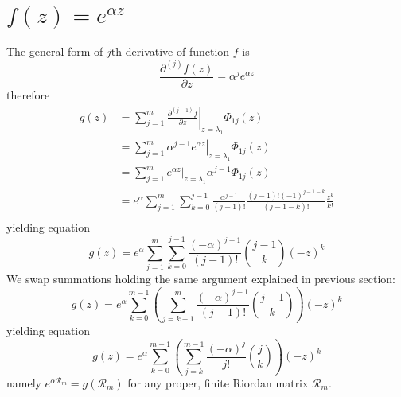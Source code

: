 \section{$f(z)=e^{\alpha z}$}

The general form of $j$th derivative of function $f$ is 
$$\frac{\partial^{(j)}{f}(z)}{\partial{z}} = \alpha^{j} e^{\alpha z}$$ 
therefore
\begin{displaymath}
\begin{split}
  g(z) &= \sum_{j=1}^{m}{ \left. \frac{\partial^{(j-1)}{f}}{\partial{z}} \right|_{z=\lambda_{1}}\Phi_{1j}(z)} \\
       &= \sum_{j=1}^{m}{ \left. \alpha^{j-1} e^{\alpha z} \right|_{z=\lambda_{1}}\Phi_{1j}(z)} \\
       &= \sum_{j=1}^{m}{ \left. e^{\alpha z} \right|_{z=\lambda_{1}}\alpha^{j-1} \Phi_{1j}(z)} \\
       &= e^{\alpha}\sum_{j=1}^{m}{\sum_{k=0}^{j-1}{\frac{\alpha^{j-1}}{(j-1)!}  \frac{(j-1)!(-1)^{j-1-k}}{(j-1-k)!}\frac{z^{k}}{k!}}}\\
\end{split}
\end{displaymath}
yielding equation
\begin{equation}
  g(z) = e^{\alpha}\sum_{j=1}^{m}{\sum_{k=0}^{j-1}{\frac{(-\alpha)^{j-1}}{(j-1)!}{{j-1}\choose{k}}(-z)^{k}}} 
\end{equation}
We swap summations holding the same argument explained in previous section:
\begin{displaymath}
  g(z) = e^{\alpha}\sum_{k=0}^{m-1}{\left(\sum_{j=k+1}^{m}{\frac{(-\alpha)^{j-1}}{(j-1)!}{{j-1}\choose{k}}}\right)(-z)^{k}}
\end{displaymath}
yielding equation
\begin{equation}
  g(z) = e^{\alpha}\sum_{k=0}^{m-1}{\left(\sum_{j=k}^{m-1}{\frac{(-\alpha)^{j}}{j!}{{j}\choose{k}}}\right)(-z)^{k}}
\end{equation}
namely $e^{\alpha\mathcal{R}_{m}}=g(\mathcal{R}_{m})$ for any proper, 
finite Riordan matrix $\mathcal{R}_{m}$.

